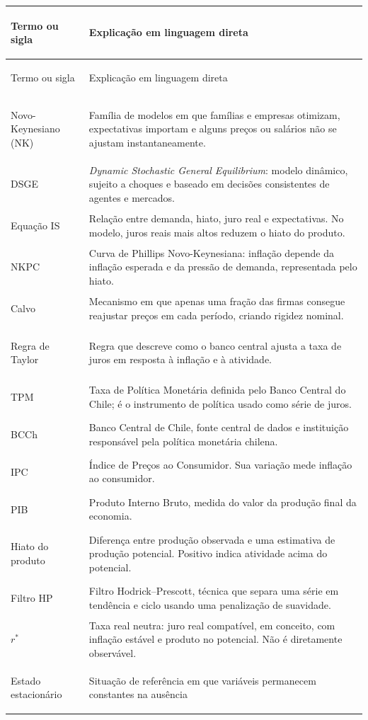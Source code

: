 \documentclass[11pt,a4paper]{article}
\begin{document}
\begin{longtable}{>{\bfseries\raggedright\arraybackslash}p{}>{\raggedright\arraybackslash}p{}}
\toprule
Termo ou sigla & Explicação em linguagem direta \\
\midrule
\endfirsthead
\toprule
Termo ou sigla & Explicação em linguagem direta \\
\midrule
\endhead
Novo-Keynesiano (NK) & Família de modelos em que famílias e empresas otimizam, expectativas
importam e alguns preços ou salários não se ajustam instantaneamente. \\
DSGE & \textit{Dynamic Stochastic General Equilibrium}: modelo dinâmico, sujeito a choques e
baseado em decisões consistentes de agentes e mercados. \\
Equação IS & Relação entre demanda, hiato, juro real e expectativas. No modelo, juros reais mais
altos reduzem o hiato do produto. \\
NKPC & Curva de Phillips Novo-Keynesiana: inflação depende da inflação esperada e da pressão de
demanda, representada pelo hiato. \\
Calvo & Mecanismo em que apenas uma fração das firmas consegue reajustar preços em cada período,
criando rigidez nominal. \\
Regra de Taylor & Regra que descreve como o banco central ajusta a taxa de juros em resposta à
inflação e à atividade. \\
TPM & Taxa de Política Monetária definida pelo Banco Central do Chile; é o instrumento de política
usado como série de juros. \\
BCCh & Banco Central de Chile, fonte central de dados e instituição responsável pela política
monetária chilena. \\
IPC & Índice de Preços ao Consumidor. Sua variação mede inflação ao consumidor. \\
PIB & Produto Interno Bruto, medida do valor da produção final da economia. \\
Hiato do produto & Diferença entre produção observada e uma estimativa de produção potencial.
Positivo indica atividade acima do potencial. \\
Filtro HP & Filtro Hodrick--Prescott, técnica que separa uma série em tendência e ciclo usando uma
penalização de suavidade. \\
\(r^\ast\) & Taxa real neutra: juro real compatível, em conceito, com inflação estável e produto no
potencial. Não é diretamente observável. \\
Estado estacionário & Situação de referência em que variáveis permanecem constantes na ausência

\end{longtable}
\end{document}
